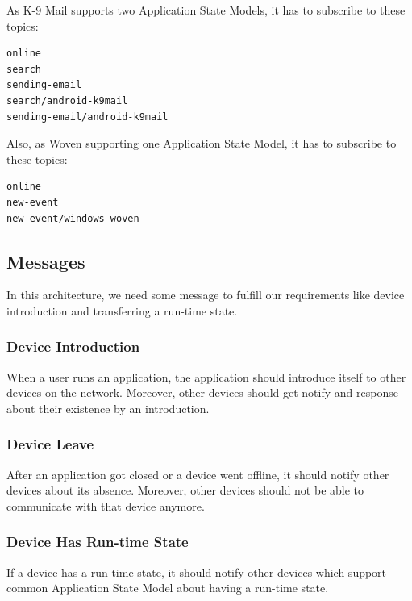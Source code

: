 As K-9 Mail supports two Application State Models, it has to subscribe to these topics:
\begin{verbatim}
online
search
sending-email
search/android-k9mail
sending-email/android-k9mail
\end{verbatim}


Also, as Woven supporting one Application State Model, it has to subscribe to these topics:
\begin{verbatim}
online
new-event
new-event/windows-woven
\end{verbatim}



\subsection{Messages}
In this architecture, we need some message to fulfill our requirements like device introduction and transferring a run-time state.

\subsubsection{Device Introduction}
When a user runs an application, the application should introduce itself to other devices on the network. Moreover, other devices should get notify and response about their existence by an introduction.

\subsubsection{Device Leave}
After an application got closed or a device went offline, it should notify other devices about its absence. Moreover, other devices should not be able to communicate with that device anymore.

\subsubsection{Device Has Run-time State}
If a device has a run-time state, it should notify other devices which support  common Application State Model about having a run-time state.

